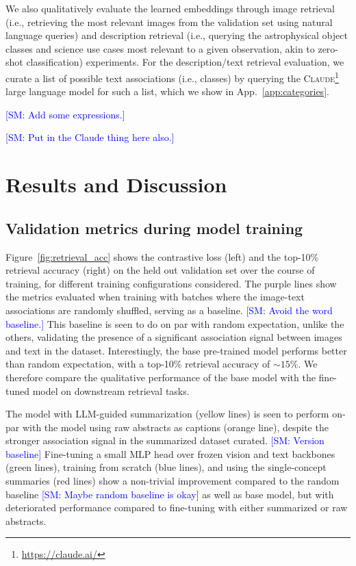 \documentclass[10pt]{article} %
\newcommand{\SM}[1]{\textcolor{blue}{[SM: #1]}}
\begin{document}
We also qualitatively evaluate the learned embeddings through image retrieval (i.e., retrieving the most relevant images from the validation set using natural language queries) and description retrieval (i.e., querying the astrophysical object classes and science use cases most relevant to a given observation, akin to zero-shot classification) experiments. 
%
For the description/text retrieval evaluation, we curate a list of possible text associations (i.e., classes) by querying the \textsc{Claude}\footnote{\url{https://claude.ai/}} large language model for such a list, which we show in App.~\ref{app:categories}.

\SM{Add some expressions.}

\SM{Put in the Claude thing here also.}

\section{Results and Discussion}
\label{sec:results}

\subsection{Validation metrics during model training}

Figure~\ref{fig:retrieval_acc} shows the contrastive loss (left) and the top-10\% retrieval accuracy (right) on the held out validation set over the course of training, for different training configurations considered.
%
The purple lines show the metrics evaluated when training with batches where the image-text associations are randomly shuffled, serving as a baseline. \SM{Avoid the word baseline.}
%
This baseline is seen to do on par with random expectation, unlike the others, validating the presence of a significant association signal between images and text in the dataset.
%
Interestingly, the base pre-trained model performs better than random expectation, with a top-10\% retrieval accuracy of $\sim 15\%$.
%
We therefore compare the qualitative performance of the base model with the fine-tuned model on downstream retrieval tasks.

The model with LLM-guided summarization (yellow lines) is seen to perform on-par with the model using raw abstracts as captions (orange line), despite the stronger association signal in the summarized dataset curated. \SM{Version baseline}
%
Fine-tuning a small MLP head over frozen vision and text backbones (green lines), training from scratch (blue lines), and using the single-concept summaries (red lines) show a non-trivial improvement compared to the random baseline \SM{Maybe random baseline is okay} as well as base model, but with deteriorated performance compared to fine-tuning with either summarized or raw abstracts.
\end{document}
